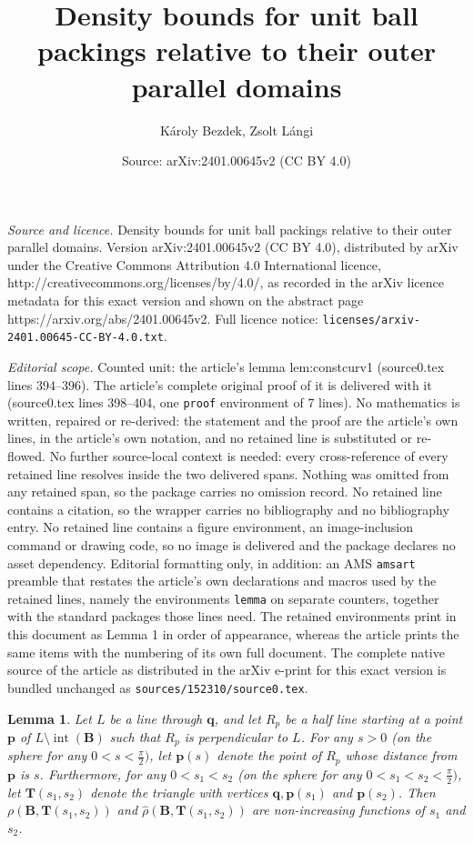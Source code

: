 \documentclass[10pt,a4paper]{amsart}
\title{Density bounds for unit ball packings relative to their outer parallel domains}
\author{K\'aroly Bezdek, Zsolt L\'angi}
\date{Source: arXiv:2401.00645v2 (CC BY 4.0)}
\newtheorem{lemma}{Lemma}
\newcommand{\BB}{\mathbf{B}}
\newcommand{\TT}{\mathbf{T}}
\DeclareMathOperator{\inter}{int}
\newcommand{\p}{\mathbf{p}}
\newcommand{\q}{\mathbf{q}}
\begin{document}
\maketitle

\noindent\emph{Source and licence.} Density bounds for unit ball packings relative to their outer parallel domains. Version arXiv:2401.00645v2 (CC BY 4.0), distributed by arXiv under the Creative Commons Attribution 4.0 International licence, http://creativecommons.org/licenses/by/4.0/, as recorded in the arXiv licence metadata for this exact version and shown on the abstract page https://arxiv.org/abs/2401.00645v2. Full licence notice: \texttt{licenses/arxiv-2401.00645-CC-BY-4.0.txt}.\par\smallskip

\noindent\textit{Editorial scope.} Counted unit: the article's lemma lem:constcurv1 (source0.tex lines 394--396). The article's complete original proof of it is delivered with it (source0.tex lines 398--404, one \texttt{proof} environment of 7 lines). No mathematics is written, repaired or re-derived: the statement and the proof are the article's own lines, in the article's own notation, and no retained line is substituted or re-flowed.  No further source-local context is needed: every cross-reference of every retained line resolves inside the two delivered spans.  Nothing was omitted from any retained span, so the package carries no omission record.  No retained line contains a citation, so the wrapper carries no bibliography and no bibliography entry.  No retained line contains a figure environment, an image-inclusion command or drawing code, so no image is delivered and the package declares no asset dependency.  Editorial formatting only, in addition: an AMS \texttt{amsart} preamble that restates the article's own declarations and macros used by the retained lines, namely the environments \texttt{lemma} on separate counters, together with the standard packages those lines need.  The retained environments print in this document as Lemma 1 in order of appearance, whereas the article prints the same items with the numbering of its own full document.  The complete native source of the article as distributed in the arXiv e-print for this exact version is bundled unchanged as \texttt{sources/152310/source0.tex}.
\begin{lemma}\label{lem:constcurv1}
Let $L$ be a line through $\q$, and let $R_p$ be a half line starting at a point $\p$ of $L \setminus \inter (\BB)$ such that $R_p$ is perpendicular to $L$. For any $s >0 $ (on the sphere for any $0 < s < \frac{\pi}{2})$, let $\p(s)$ denote the point of $R_p$ whose distance from $\p$ is $s$. Furthermore, for any $0 < s_1 < s_2$ (on the sphere for any $0 < s_1 < s_2 < \frac{\pi}{2})$, let $\TT(s_1,s_2)$ denote the triangle with vertices $\q, \p(s_1)$ and $\p(s_2)$. Then $\rho(\BB,\TT(s_1,s_2))$ and $\hat{\rho}(\BB,\TT(s_1,s_2))$ are non-increasing functions of $s_1$ and $s_2$.
\end{lemma}
\end{document}
